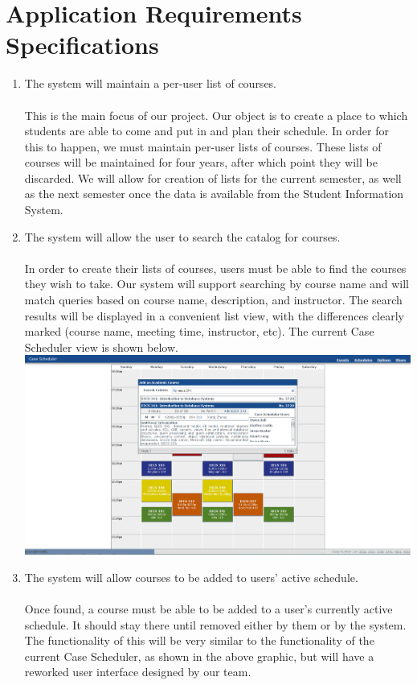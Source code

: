 \documentclass[pdftex,12pt,letter]{article}
\begin{document}
\section*{Application Requirements Specifications}
\begin{enumerate}[1.]
\item The system will maintain a per-user list of courses.\\\\
This is the main focus of our project. Our object is to create a place to which students are able to come and put in and plan their schedule. In order for this to happen, we must maintain per-user lists of courses. These lists of courses will be maintained for four years, after which point they will be discarded. We will allow for creation of lists for the current semester, as well as the next semester once the data is available from the Student Information System.
\item The system will allow the user to search the catalog for courses.\\\\
In order to create their lists of courses, users must be able to find the courses they wish to take. Our system will support searching by course name and will match queries based on course name, description, and instructor. The search results will be displayed in a convenient list view, with the differences clearly marked (course name, meeting time, instructor, etc). The current Case Scheduler view is shown below.\\
\includegraphics[width=130mm]{add_course.png}
\item The system will allow courses to be added to users' active schedule.\\\\
Once found, a course must be able to be added to a user's currently active schedule. It should stay there until removed either by them or by the system. The functionality of this will be very similar to the functionality of the current Case Scheduler, as shown in the above graphic, but will have a reworked user interface designed by our team.

\end{enumerate}
\end{document}
